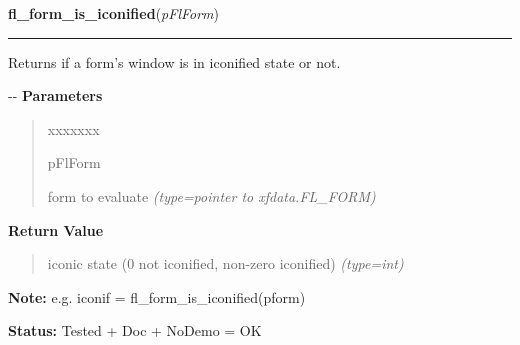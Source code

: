 \hspace{.8\funcindent}\begin{boxedminipage}{\funcwidth}

    \raggedright \textbf{fl\_form\_is\_iconified}(\textit{pFlForm})

    \vspace{-1.5ex}

    \rule{\textwidth}{0.5\fboxrule}
\setlength{\parskip}{2ex}

Returns if a form's window is in iconified state or not.

-{}-
\setlength{\parskip}{1ex}
      \textbf{Parameters}
      \vspace{-1ex}

      \begin{quote}
        \begin{Ventry}{xxxxxxx}

          \item[pFlForm]


form to evaluate
            {\it (type=pointer to xfdata.FL\_FORM)}

        \end{Ventry}

      \end{quote}

      \textbf{Return Value}
    \vspace{-1ex}

      \begin{quote}

iconic state (0 not iconified, non-zero iconified)
      {\it (type=int)}

      \end{quote}

\textbf{Note:} 
e.g. iconif = fl\_form\_is\_iconified(pform)


\textbf{Status:} 
Tested + Doc + NoDemo = OK


    \end{boxedminipage}

    \label{xformslib:flbasic:fl_register_raw_callback}

    \vspace{0.5ex}

